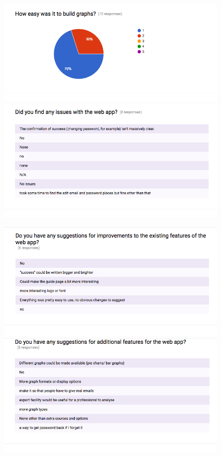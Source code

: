 \documentclass[11pt,openright,a4paper]{report}
\begin{document}
\begin{appendices}
\begin{figure}[ht]
  \centering
  \includegraphics[width=.9\textwidth]{i/testingresponses10.png}
  \includegraphics[width=.9\textwidth]{i/testingresponses11.png}
\end{figure}

\begin{figure}[ht]
  \centering
  \includegraphics[width=.9\textwidth]{i/testingresponses12.png}
  \includegraphics[width=.9\textwidth]{i/testingresponses13.png}
\end{figure}


\end{appendices}
\end{document}
